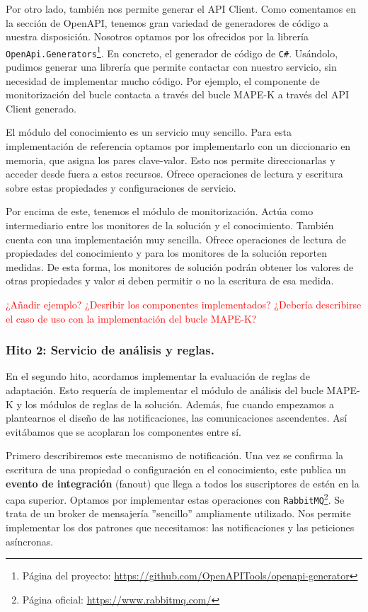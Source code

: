 Por otro lado, también nos permite generar el API Client. Como comentamos en la sección de OpenAPI, tenemos gran variedad de generadores de código a nuestra disposición. Nosotros optamos por los ofrecidos por la librería \texttt{OpenApi.Generators}\footnote{Página del proyecto: \url{https://github.com/OpenAPITools/openapi-generator}}. En concreto, el generador de código de \verb|C#|. Usándolo, pudimos generar una librería que permite contactar con nuestro servicio, sin necesidad de implementar mucho código. Por ejemplo, el componente de monitorización del bucle contacta a través del bucle MAPE-K a través del API Client generado.

El módulo del conocimiento es un servicio muy sencillo. Para esta implementación de referencia optamos por implementarlo con un diccionario en memoria, que asigna los pares clave-valor. Esto nos permite direccionarlas y acceder desde fuera a estos recursos. Ofrece operaciones de lectura y escritura sobre estas propiedades y configuraciones de servicio.

Por encima de este, tenemos el módulo de monitorización. Actúa como intermediario entre los monitores de la solución y el conocimiento. También cuenta con una implementación muy sencilla. Ofrece operaciones de lectura de propiedades del conocimiento y para los monitores de la solución reporten medidas. De esta forma, los monitores de solución podrán obtener los valores de otras propiedades y valor si deben permitir o no la escritura de esa medida.

\textcolor{red}{¿Añadir ejemplo? ¿Desribir los componentes implementados? ¿Debería describirse el caso de uso con la implementación del bucle MAPE-K?}

\subsubsection{Hito 2: Servicio de análisis y reglas.}

En el segundo hito, acordamos implementar la evaluación de reglas de adaptación. Esto requería de implementar el módulo de análisis del bucle MAPE-K y los módulos de reglas de la solución. Además, fue cuando empezamos a plantearnos el diseño de las notificaciones, las comunicaciones ascendentes. Así evitábamos que se acoplaran los componentes entre sí.

Primero describiremos este mecanismo de notificación. Una vez se confirma la escritura de una propiedad o configuración en el conocimiento, este publica un \textbf{evento de integración} (fanout) que llega a todos los suscriptores de estén en la capa superior. Optamos por implementar estas operaciones con \texttt{RabbitMQ}\footnote{Página oficial: \url{https://www.rabbitmq.com/}}. Se trata de un broker de mensajería ''sencillo'' ampliamente utilizado. Nos permite implementar los dos patrones que necesitamos: las notificaciones y las peticiones asíncronas.

